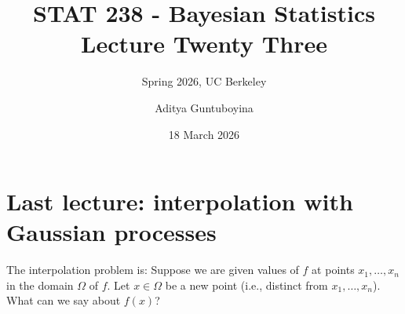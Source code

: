 \documentclass{scrartcl}
\begin{document}
\title{STAT 238 - Bayesian Statistics  \\
  Lecture Twenty Three} 
\subtitle{Spring 2026, UC Berkeley}

\author{Aditya Guntuboyina}


\date{18 March 2026}

\maketitle

\section{Last lecture: interpolation with Gaussian processes}
The interpolation problem is: Suppose we are given values of $f$ at
points $x_1, \dots, x_n$ in the domain $\Omega$ of $f$. Let $x \in
\Omega$ be a new point (i.e., distinct from  
$x_1, \dots, x_n$). What can we say about $f(x)$?
\end{document}
